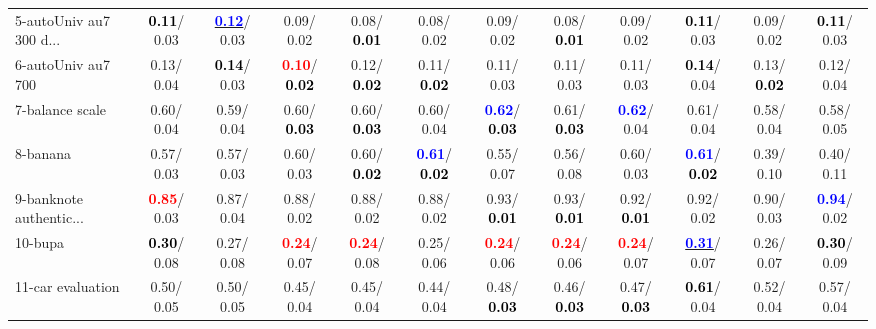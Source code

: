 \begin{table}[h]
\begin{center}
{\begin{tabular}{lc|c|c|c|c|c|c|c|c|c|c}
5-autoUniv au7 300 d... & \textcolor{black}{\textbf{  0.11}}/  0.03 & \underline{\textcolor{blue}{\textbf{  0.12}}}/  0.03 &   0.09/  0.02 &   0.08/\textcolor{black}{\textbf{  0.01}} &   0.08/  0.02 &   0.09/  0.02 &   0.08/\textcolor{black}{\textbf{  0.01}} &   0.09/  0.02 & \textcolor{black}{\textbf{  0.11}}/  0.03 &   0.09/  0.02 & \textcolor{black}{\textbf{  0.11}}/  0.03 \\
6-autoUniv au7 700 &   0.13/  0.04 & \textcolor{black}{\textbf{  0.14}}/  0.03 & \textcolor{red}{\textbf{  0.10}}/\textcolor{black}{\textbf{  0.02}} &   0.12/\textcolor{black}{\textbf{  0.02}} &   0.11/\textcolor{black}{\textbf{  0.02}} &   0.11/  0.03 &   0.11/  0.03 &   0.11/  0.03 & \textcolor{black}{\textbf{  0.14}}/  0.04 &   0.13/\textcolor{black}{\textbf{  0.02}} &   0.12/  0.04 \\
7-balance scale &   0.60/  0.04 &   0.59/  0.04 &   0.60/\textcolor{black}{\textbf{  0.03}} &   0.60/\textcolor{black}{\textbf{  0.03}} &   0.60/  0.04 & \textcolor{blue}{\textbf{  0.62}}/\textcolor{black}{\textbf{  0.03}} &   0.61/\textcolor{black}{\textbf{  0.03}} & \textcolor{blue}{\textbf{  0.62}}/  0.04 &   0.61/  0.04 &   0.58/  0.04 &   0.58/  0.05 \\ \hline
8-banana &   0.57/  0.03 &   0.57/  0.03 &   0.60/  0.03 &   0.60/\textcolor{black}{\textbf{  0.02}} & \textcolor{blue}{\textbf{  0.61}}/\textcolor{black}{\textbf{  0.02}} &   0.55/  0.07 &   0.56/  0.08 &   0.60/  0.03 & \textcolor{blue}{\textbf{  0.61}}/\textcolor{black}{\textbf{  0.02}} &   0.39/  0.10 &   0.40/  0.11 \\
9-banknote authentic... & \textcolor{red}{\textbf{  0.85}}/  0.03 &   0.87/  0.04 &   0.88/  0.02 &   0.88/  0.02 &   0.88/  0.02 &   0.93/\textcolor{black}{\textbf{  0.01}} &   0.93/\textcolor{black}{\textbf{  0.01}} &   0.92/\textcolor{black}{\textbf{  0.01}} &   0.92/  0.02 &   0.90/  0.03 & \textcolor{blue}{\textbf{  0.94}}/  0.02 \\
10-bupa & \textcolor{black}{\textbf{  0.30}}/  0.08 &   0.27/  0.08 & \textcolor{red}{\textbf{  0.24}}/  0.07 & \textcolor{red}{\textbf{  0.24}}/  0.08 &   0.25/  0.06 & \textcolor{red}{\textbf{  0.24}}/  0.06 & \textcolor{red}{\textbf{  0.24}}/  0.06 & \textcolor{red}{\textbf{  0.24}}/  0.07 & \underline{\textcolor{blue}{\textbf{  0.31}}}/  0.07 &   0.26/  0.07 & \textcolor{black}{\textbf{  0.30}}/  0.09 \\
11-car evaluation &   0.50/  0.05 &   0.50/  0.05 &   0.45/  0.04 &   0.45/  0.04 &   0.44/  0.04 &   0.48/\textcolor{black}{\textbf{  0.03}} &   0.46/\textcolor{black}{\textbf{  0.03}} &   0.47/\textcolor{black}{\textbf{  0.03}} & \textcolor{black}{\textbf{  0.61}}/  0.04 &   0.52/  0.04 &   0.57/  0.04 \\

\end{tabular}}
\end{center}
\end{table}
